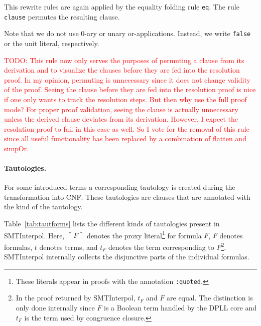 \documentclass[a4paper]{article}
\newcommand\si{SMTInterpol\xspace}
\newcommand\todo[1]{\textcolor{red}{TODO: #1}}
\newcommand\quoted[1]{\ulcorner #1 \urcorner}
\begin{document}
This rewrite rules are again applied by the equality folding rule \texttt{eq}.
The rule \texttt{clause} permutes the resulting clause.
\begin{mathpar}
\end{mathpar}
Note that we do not use $0$-ary or unary or-applications.  Instead, we write
\texttt{false} or the unit literal, respectively.

\todo{This rule now only serves the purposes of permuting a clause from its
  derivation and to visualize the clauses before they are fed into the
  resolution proof.  In my opinion, permuting is unnecessary since it does not
  change validity of the proof.  Seeing the clause before they are fed into
  the resolution proof is nice if one only wants to track the resolution
  steps.  But then why use the full proof mode?  For proper proof validation,
  seeing the clause is actually unnecessary unless the derived clause deviates
  from its derivation.  However, I expect the resolution proof to fail in this
  case as well.  So I vote for the removal of this rule since all useful
  functionality has been replaced by a combination of flatten and simpOr.}

\paragraph{Tautologies.}  For some introduced terms a corresponding tautology
is created during the transformation into CNF.  These tautologies are
clauses that are annotated with the kind of the tautology.

Table~\ref{tab:tautforms} lists the different kinds of tautologies present
in \si.  Here, $\quoted{F}$ denotes the proxy
literal\footnote{These literals appear in proofs with the annotation
  \texttt{:quoted}.} for formula $F$, $F$ denotes formulas, $t$ denotes terms,
and $t_F$ denotes the term corresponding to $F$\footnote{In the proof returned
  by \si, $t_F$ and $F$ are equal.  The distinction is only done internally
  since $F$ is a Boolean term handled by the DPLL core and $t_F$ is the term
  used by congruence closure.}.
\si internally collects the disjunctive parts of the individual formulas.
\end{document}
